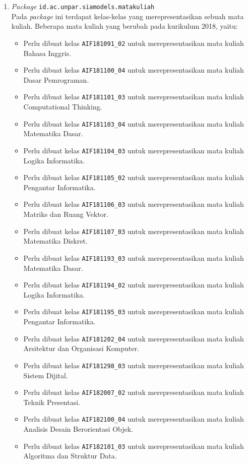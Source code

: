 \begin{enumerate}
	\item \textit{Package} \texttt{id.ac.unpar.siamodels.matakuliah} \\
	Pada \textit{package} ini terdapat kelas-kelas yang merepresentasikan sebuah mata kuliah. Beberapa mata kuliah yang berubah pada kurikulum 2018, yaitu:
	\begin{itemize}
		\item Perlu dibuat kelas \texttt{AIF181091\_02} untuk merepresentasikan mata kuliah Bahasa Inggris.
		\item Perlu dibuat kelas \texttt{AIF181100\_04} untuk merepresentasikan mata kuliah Dasar Pemrograman.
		\item Perlu dibuat kelas \texttt{AIF181101\_03} untuk merepresentasikan mata kuliah Computational Thinking.
		\item Perlu dibuat kelas \texttt{AIF181103\_04} untuk merepresentasikan mata kuliah Matematika Dasar.
		\item Perlu dibuat kelas \texttt{AIF181104\_03} untuk merepresentasikan mata kuliah Logika Informatika.
		\item Perlu dibuat kelas \texttt{AIF181105\_02} untuk merepresentasikan mata kuliah Pengantar Informatika.
		\item Perlu dibuat kelas \texttt{AIF181106\_03} untuk merepresentasikan mata kuliah Matriks dan Ruang Vektor.
		\item Perlu dibuat kelas \texttt{AIF181107\_03} untuk merepresentasikan mata kuliah Matematika Diskret.
		\item Perlu dibuat kelas \texttt{AIF181193\_03} untuk merepresentasikan mata kuliah Matematika Dasar.
		\item Perlu dibuat kelas \texttt{AIF181194\_02} untuk merepresentasikan mata kuliah Logika Informatika.
		\item Perlu dibuat kelas \texttt{AIF181195\_03} untuk merepresentasikan mata kuliah Pengantar Informatika.
		\item Perlu dibuat kelas \texttt{AIF181202\_04} untuk merepresentasikan mata kuliah Arsitektur dan Organisasi Komputer.
		\item Perlu dibuat kelas \texttt{AIF181298\_03} untuk merepresentasikan mata kuliah Sistem Dijital.
		\item Perlu dibuat kelas \texttt{AIF182007\_02} untuk merepresentasikan mata kuliah Teknik Presentasi.
		\item Perlu dibuat kelas \texttt{AIF182100\_04} untuk merepresentasikan mata kuliah Analisis Desain Berorientasi Objek.
		\item Perlu dibuat kelas \texttt{AIF182101\_03} untuk merepresentasikan mata kuliah Algoritma dan Struktur Data.

\end{itemize}
\end{enumerate}
